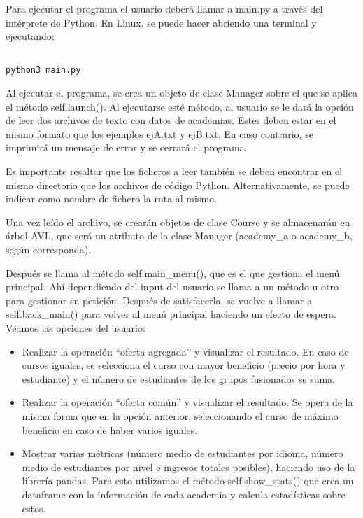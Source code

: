 \documentclass[a4paper]{article}
\begin{document}
Para ejecutar el programa el usuario deberá llamar a main.py a través del intérprete de Python. En Linux, se puede hacer abriendo una terminal y ejecutando:

\begin{lstlisting}

python3 main.py

\end{lstlisting}

Al ejecutar el programa, se crea un objeto de clase Manager sobre el que se aplica el método self.launch(). Al ejecutarse esté método, al usuario se le dará la opción de leer dos archivos de texto con datos de academias. Estes deben estar en el mismo formato que los ejemplos ejA.txt y ejB.txt. En caso contrario, se imprimirá un mensaje de error y se cerrará el programa.

Es importante resaltar que los ficheros a leer también se deben encontrar en el mismo directorio que los archivos de código Python. Alternativamente, se puede indicar como nombre de fichero la ruta al mismo.

Una vez leído el archivo, se crearán objetos de clase Course y se almacenarán en árbol AVL, que será un atributo de la clase Manager (academy\_a o academy\_b, según corresponda).

Después se llama al método self.main\_menu(), que es el que gestiona el menú principal. Ahí dependiendo del input del usuario se llama a un método u otro para gestionar su petición. Después de satisfacerla, se vuelve a llamar a self.back\_main() para volver al menú principal haciendo un efecto de espera. Veamos las opciones del usuario:

\begin{itemize}

\item{Realizar la operación ``oferta agregada'' y visualizar el resultado. En caso de cursos iguales, se selecciona el curso con mayor beneficio (precio por hora y estudiante) y el número de estudiantes de los grupos fusionados se
suma.} %

\item{Realizar la operación “oferta común” y visualizar el resultado. Se opera de la misma forma que en la opción anterior, seleccionando el curso de máximo beneficio en caso de haber varios iguales.}

\item{Mostrar varias métricas (número medio de estudiantes por idioma, número medio de estudiantes por nivel e ingresos totales posibles), haciendo uso de la librería pandas. Para esto utilizamos el método self.show\_stats() que crea un dataframe con la información de cada academia y calcula estadísticas sobre estos.}

\end{itemize}
\end{document}
